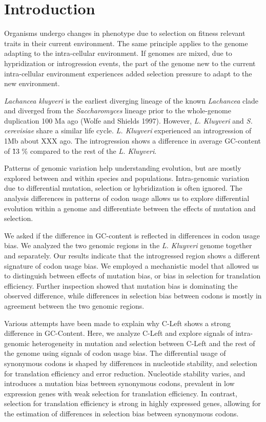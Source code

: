 \documentclass[12pt,draft]{article}
\begin{document}
\section*{Introduction}

Organisms undergo changes in phenotype due to selection on fitness relevant traits in their current environment. 
The same principle applies to the genome adapting to the intra-cellular environment.
If genomes are mixed, due to hypridization or introgression events, the part of the genome new to the current intra-cellular environment experiences added selection pressure to adapt to the new environment.

\textit{Lachancea kluyveri} is the earliest diverging lineage of the known \textit{Lachancea} clade and diverged from the \textit{Saccharomyces} lineage prior to the whole-genome duplication 100 Ma ago (Wolfe and Shields 1997). 
However, \textit{L. Kluyveri} and \textit{S. cerevisiae} share a similar life cycle.
\textit{L. Kluyveri} experienced an introgression of 1Mb about XXX ago. 
The introgression shows a difference in average GC-content of \~ 13 \% compared to the rest of the \textit{L. Kluyveri}.

Patterns of genomic variation help understanding evolution, but are mostly explored between and within species and populations.
Intra-genomic variation due to differential mutation, selection or hybridization is often ignored.
The analysis differences in patterns of codon usage allows us to explore differential evolution within a genome and differentiate between the effects of mutation and selection.

We asked if the difference in GC-content is reflected in differences in codon usage bias.
We analyzed the two genomic regions in the \textit{L. Kluyveri} genome together and separately.
Our results indicate that the introgressed region shows a different signature of codon usage bias.
We employed a mechanistic model that allowed us to distinguish between effects of mutation bias, or bias in selection for translation efficiency.
Further inspection showed that mutation bias is dominating the observed difference, while differences in selection bias between codons is mostly in agreement between the two genomic regions. 

Various attempts have been made to explain why C-Left shows a strong difference in GC-Content.
Here, we analyze C-Left and explore signals of intra-genomic heterogeneity in mutation and selection between C-Left and the rest of the genome using signals of codon usage bias.
The differential usage of synonymous codons is shaped by differences in nucleotide stability, and selection for translation efficiency and error reduction.
Nucleotide stability varies, and introduces a mutation bias between synonymous codons, prevalent in low expression genes with weak selection for translation efficiency.
In contrast, selection for translation efficiency is strong in highly expressed genes, allowing for the estimation of differences in selection bias between synonymous codons.
\end{document}
